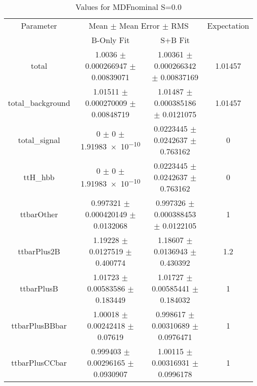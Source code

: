 \begin{table}
\centering
\caption{Values for MDFnominal S=0.0}
\begin{tabular}{cccc}
\toprule
Parameter & \multicolumn{2}{c}{Mean $\pm$ Mean Error $\pm$ RMS} & Expectation\\
 & B-Only Fit & S+B Fit & \\
\midrule
total & \num{1.0036} $\pm$ \num{0.000266947} $\pm$ \num{0.00839071} & \num{1.00361} $\pm$ \num{0.000266342} $\pm$ \num{0.00837169} & \num{1.01457}\\
total\_background & \num{1.01511} $\pm$ \num{0.000270009} $\pm$ \num{0.00848719} & \num{1.01487} $\pm$ \num{0.000385186} $\pm$ \num{0.0121075} & \num{1.01457}\\
total\_signal & \num{0} $\pm$ \num{0} $\pm$ \num{1.91983e-10} & \num{0.0223445} $\pm$ \num{0.0242637} $\pm$ \num{0.763162} & \num{0}\\
ttH\_hbb & \num{0} $\pm$ \num{0} $\pm$ \num{1.91983e-10} & \num{0.0223445} $\pm$ \num{0.0242637} $\pm$ \num{0.763162} & \num{0}\\
ttbarOther & \num{0.997321} $\pm$ \num{0.000420149} $\pm$ \num{0.0132068} & \num{0.997326} $\pm$ \num{0.000388453} $\pm$ \num{0.0122105} & \num{1}\\
ttbarPlus2B & \num{1.19228} $\pm$ \num{0.0127519} $\pm$ \num{0.400774} & \num{1.18607} $\pm$ \num{0.0136943} $\pm$ \num{0.430392} & \num{1.2}\\
ttbarPlusB & \num{1.01723} $\pm$ \num{0.00583586} $\pm$ \num{0.183449} & \num{1.01727} $\pm$ \num{0.00585441} $\pm$ \num{0.184032} & \num{1}\\
ttbarPlusBBbar & \num{1.00018} $\pm$ \num{0.00242418} $\pm$ \num{0.07619} & \num{0.998617} $\pm$ \num{0.00310689} $\pm$ \num{0.0976471} & \num{1}\\
ttbarPlusCCbar & \num{0.999403} $\pm$ \num{0.00296165} $\pm$ \num{0.0930907} & \num{1.00115} $\pm$ \num{0.00316931} $\pm$ \num{0.0996178} & \num{1}\\
\bottomrule
\end{tabular}
\end{table}